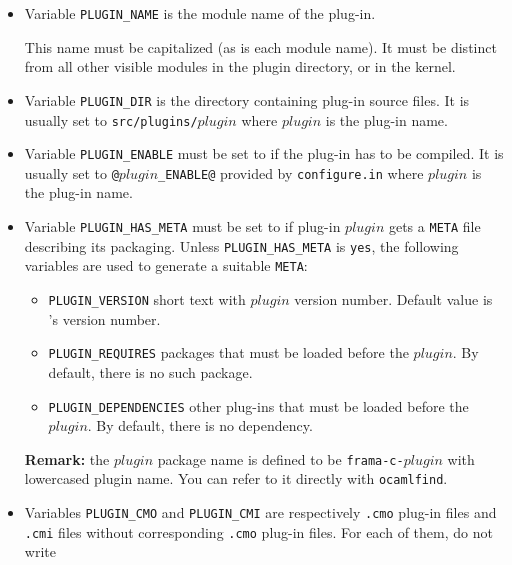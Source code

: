 \begin{itemize}
\item Variable \texttt{PLUGIN\_NAME}
  is the module name of the plug-in.

  \begin{important}
    This name must be capitalized (as is each \caml module name). It
    must be distinct from all other visible modules in the plugin
    directory, or in the \framac kernel.
  \end{important}
\item Variable \texttt{PLUGIN\_DIR}
  is the directory containing plug-in source files. It
  is usually set to \texttt{src/plugins/$plugin$} where $plugin$ is the
  plug-in name.
\item Variable
  \texttt{PLUGIN\_ENABLE} must be
  set to \yes if the plug-in has to be compiled. It is usually set to
  \texttt{@$plugin$\_ENABLE@} provided by \texttt{configure.in} where $plugin$
  is the plug-in name.
\item Variable
  \texttt{PLUGIN\_HAS\_META} must
  be set to \yes if plug-in $plugin$ gets a \texttt{META} file
  describing its packaging. Unless \texttt{PLUGIN\_HAS\_META} is \texttt{yes},
  the following variables are used to generate a suitable \texttt{META}:
  \begin{itemize}
  \item \texttt{PLUGIN\_VERSION}
     short text with $plugin$ version number.
     Default value is \framac's version number.
  \item \texttt{PLUGIN\_REQUIRES}
     packages that must be loaded before the $plugin$.
     By default, there is no such package.
  \item \texttt{PLUGIN\_DEPENDENCIES}
     other plug-ins that must be loaded before the $plugin$.
     By default, there is no dependency.
  \end{itemize}
  \textbf{Remark:} the $plugin$ package name is defined to be \texttt{frama-c-$plugin$} with 
  lowercased plugin name. You can refer to it directly with \texttt{ocamlfind}.
\item Variables \texttt{PLUGIN\_CMO}
  and \texttt{PLUGIN\_CMI} are
  respectively \texttt{.cmo} plug-in files and \texttt{.cmi} files without
  corresponding \texttt{.cmo} plug-in files. For each of them, do not write

\end{itemize}
